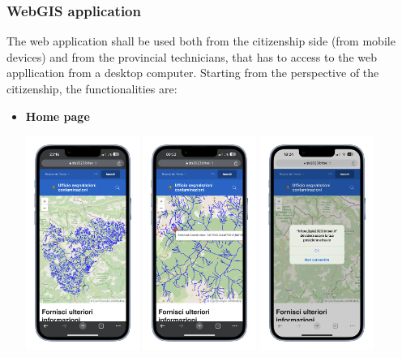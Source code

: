 \subsubsection{WebGIS application}
The web application shall be used both from the citizenship side (from mobile devices) and from the provincial technicians, that has to access to the web appllication from a desktop computer.
Starting from the perspective of the citizenship, the functionalities are:
\begin{itemize}
    \item \textbf{Home page} \\
    \begin{center} \includegraphics[width=10em]{img/home.png} \includegraphics[width=10em]{img/posizione.png} \includegraphics[width=10em]{img/autoposizione.png} \end{center}

\end{itemize}
